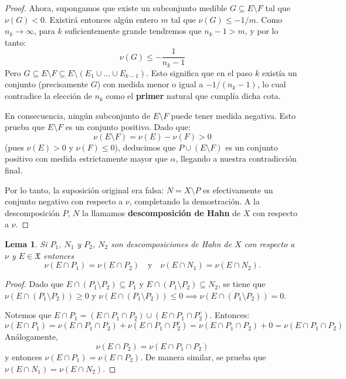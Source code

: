\documentclass[12pt,a4paper]{article}
\theoremstyle{profesional}
\newtheorem{lemma}[teorema]{Lema}
\theoremstyle{definicion-style}
\newcommand{\X}{\mathfrak{X}}
\begin{document}
\begin{proof}
    Ahora, supongamos que existe un subconjunto medible \(G \subseteq E \setminus F\) tal que \(\nu(G) < 0\). Existirá entonces algún entero \(m\) tal que \(\nu(G) \leq -1/m\). Como \(n_k \to \infty \), para \(k\) suficientemente grande tendremos que \(n_k - 1 > m\), y por lo tanto:
    \[
        \nu(G) \leq -\frac{1}{n_k - 1}
    \]
    Pero \(G \subseteq E \setminus F \subseteq E \setminus (E_1 \cup \ldots \cup E_{k-1})\). Esto significa que en el paso \(k\) existía un conjunto (precisamente \(G\)) con medida menor o igual a \(-1/(n_k - 1)\), lo cual contradice la elección de \(n_k\) como el \textbf{primer} natural que cumplía dicha cota.

    En consecuencia, ningún subconjunto de \(E \setminus F\) puede tener medida negativa. Esto prueba que \(E \setminus F\) es un conjunto positivo. Dado que:
    \[
        \nu(E \setminus F) = \nu(E) - \nu(F) > 0
    \]
    (pues \(\nu(E) > 0\) y \(\nu(F) \leq 0\)), deducimos que \(P \cup (E \setminus F)\) es un conjunto positivo con medida estrictamente mayor que \(\alpha \), llegando a nuestra contradicción final.

    Por lo tanto, la suposición original era falsa: \(N = X \setminus P\) es efectivamente un conjunto negativo con respecto a \(\nu \), completando la demostración.
    A la descomposición \( P \), \( N \) la llamamos \textbf{descomposición de Hahn} de \( X \) con respecto a \( \nu \).
\end{proof}

\begin{lemma}
    Si \( P_1 \), \( N_1 \) y \( P_2 \), \( N_2 \) son descomposiciones de Hahn de \( X \) con respecto a \( \nu \) y \( E \in \X \) entonces \[
        \nu(E \cap P_1) = \nu(E \cap P_2) \quad \text{y} \quad \nu(E \cap N_1) = \nu(E \cap N_2).
    \]
\end{lemma}
\begin{proof}
    Dado que \( E \cap (P_1 \setminus P_2) \subseteq P_1 \) y \( E \cap (P_1 \setminus P_2) \subseteq N_2 \), se tiene que
    \( \nu(E \cap (P_1 \setminus P_2)) \geq 0 \) y \( \nu(E \cap (P_1 \setminus P_2)) \leq 0 \implies \nu(E \cap (P_1 \setminus P_2)) = 0 \).

    Notemos que \( E \cap P_1 = (E \cap P_1 \cap P_2) \cup (E \cap P_1 \cap P_2^c) \). Entonces:
    \[
        \nu(E \cap P_1) = \nu(E \cap P_1 \cap P_2) + \nu(E \cap P_1 \cap P_2^c) = \nu(E \cap P_1 \cap P_2) + 0 = \nu(E \cap P_1 \cap P_2)
    \]
    Análogamente, \[
        \nu(E \cap P_2) = \nu(E \cap P_1 \cap P_2)
    \]
    y entonces \( \nu(E \cap P_1) = \nu(E \cap P_2) \). De manera similar, se prueba que \( \nu(E \cap N_1) = \nu(E \cap N_2) \).
\end{proof}
\end{document}
